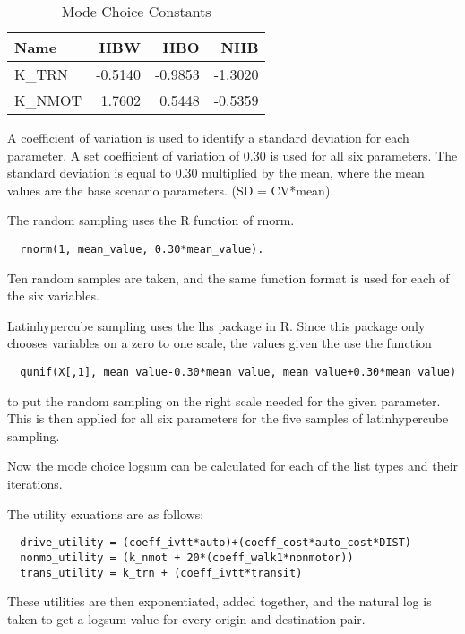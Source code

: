\documentclass[3p, authoryear, review]{elsarticle} %
\begin{document}
\begin{table}

\caption{\label{tab:MCconst}Mode Choice Constants}
\centering
\begin{tabular}[t]{l|r|r|r}
\hline
Name & HBW & HBO & NHB\\
\hline
K\_TRN & -0.5140 & -0.9853 & -1.3020\\
\hline
K\_NMOT & 1.7602 & 0.5448 & -0.5359\\
\hline
\end{tabular}
\end{table}

A coefficient of variation is used to identify a standard deviation for each parameter. A set coefficient of variation of 0.30 is used for all six parameters. The standard deviation is equal to 0.30 multiplied by the mean, where the mean values are the base scenario parameters. (SD = CV*mean).

The random sampling uses the R function of rnorm.

\begin{verbatim}
  rnorm(1, mean_value, 0.30*mean_value). 
\end{verbatim}

Ten random samples are taken, and the same function format is used for each of the six variables.

Latinhypercube sampling uses the lhs package in R. Since this package only chooses variables on a zero to one scale, the values given the use the function

\begin{verbatim}
  qunif(X[,1], mean_value-0.30*mean_value, mean_value+0.30*mean_value) 
\end{verbatim}

to put the random sampling on the right scale needed for the given parameter. This is then applied for all six parameters for the five samples of latinhypercube sampling.

Now the mode choice logsum can be calculated for each of the list types and their iterations.

The utility exuations are as follows:

\begin{verbatim}
  drive_utility = (coeff_ivtt*auto)+(coeff_cost*auto_cost*DIST)
  nonmo_utility = (k_nmot + 20*(coeff_walk1*nonmotor))
  trans_utility = k_trn + (coeff_ivtt*transit) 
\end{verbatim}

These utilities are then exponentiated, added together, and the natural log is taken to get a logsum value for every origin and destination pair.
\end{document}

